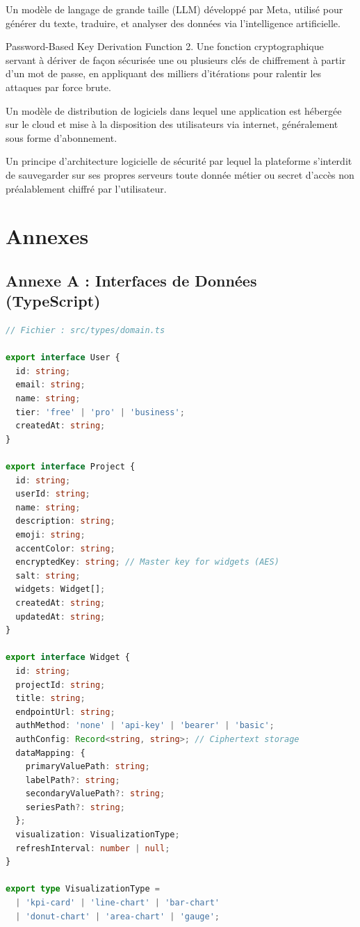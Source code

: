 ﻿\documentclass[12pt,a4paper,oneside]{report} %
\begin{document}
\begin{description}[labelwidth=3cm, leftmargin=3.5cm, style=nextline]
    \item[\textbf{Llama 3.3}] Un modèle de langage de grande taille (LLM) développé par Meta, utilisé pour générer du texte, traduire, et analyser des données via l'intelligence artificielle.
    \item[\textbf{PBKDF2}] Password-Based Key Derivation Function 2. Une fonction cryptographique servant à dériver de façon sécurisée une ou plusieurs clés de chiffrement à partir d'un mot de passe, en appliquant des milliers d'itérations pour ralentir les attaques par force brute.
    \item[\textbf{SaaS (Software as a Service)}] Un modèle de distribution de logiciels dans lequel une application est hébergée sur le cloud et mise à la disposition des utilisateurs via internet, généralement sous forme d'abonnement.
    \item[\textbf{Zero Storage}] Un principe d'architecture logicielle de sécurité par lequel la plateforme s'interdit de sauvegarder sur ses propres serveurs toute donnée métier ou secret d'accès non préalablement chiffré par l'utilisateur.
\end{description}

\newpage
\chapter*{Annexes}

\section*{Annexe A : Interfaces de Données (TypeScript)}
\begin{lstlisting}[language=TypeScript]
// Fichier : src/types/domain.ts

export interface User {
  id: string;
  email: string;
  name: string;
  tier: 'free' | 'pro' | 'business';
  createdAt: string;
}

export interface Project {
  id: string;
  userId: string;
  name: string;
  description: string;
  emoji: string;
  accentColor: string;
  encryptedKey: string; // Master key for widgets (AES)
  salt: string;
  widgets: Widget[];
  createdAt: string;
  updatedAt: string;
}

export interface Widget {
  id: string;
  projectId: string;
  title: string;
  endpointUrl: string;
  authMethod: 'none' | 'api-key' | 'bearer' | 'basic';
  authConfig: Record<string, string>; // Ciphertext storage
  dataMapping: {
    primaryValuePath: string;
    labelPath?: string;
    secondaryValuePath?: string;
    seriesPath?: string;
  };
  visualization: VisualizationType;
  refreshInterval: number | null; 
}

export type VisualizationType =
  | 'kpi-card' | 'line-chart' | 'bar-chart'
  | 'donut-chart' | 'area-chart' | 'gauge';
\end{lstlisting}
\end{document}

